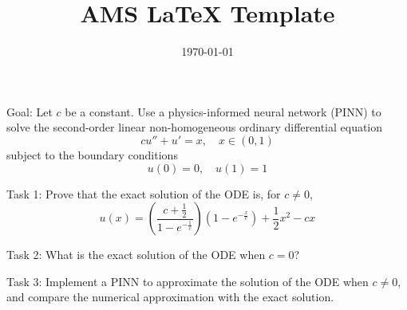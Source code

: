 \documentclass[11pt]{article}
\title{AMS \LaTeX{} Template}
\author{}
\date{\today}
\theoremstyle{definition}
\theoremstyle{remark}
\begin{document}

\noindent
Goal: Let $c$ be a constant. Use a physics-informed neural network (PINN) to solve the second-order linear non-homogeneous ordinary differential equation
\begin{equation}
    c u'' + u' = x, \quad x \in (0,1)
\end{equation}
subject to the boundary conditions
\begin{equation}
    u(0) = 0, \quad u(1) = 1
\end{equation}

\noindent
Task 1: Prove that the exact solution of the ODE is, 
for $c \neq 0$,
\begin{equation}
            u(x) = \left( \frac{c + \frac{1}{2}}{1 - e^{-\frac{1}{c}}} \right) \left( 1 - e^{-\frac{x}{c}} \right) + \frac{1}{2}x^2 - cx
\end{equation}

\noindent
Task 2: What is the exact solution of the ODE when $c = 0$?

\noindent
Task 3: Implement a PINN to approximate the solution of the ODE when $c \neq 0$, and compare the numerical approximation with the exact solution.
\end{document}

